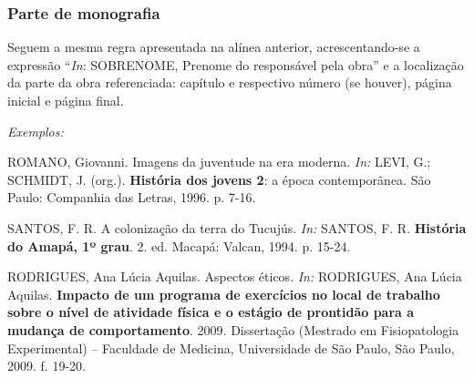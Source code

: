 \documentclass[10pt,a4paper]{article}
\newenvironment{referencias}
  {\begin{list}{}{\setlength{\leftmargin}{2.2em}\setlength{\itemsep}{\baselineskip}
     \setlength{\parsep}{0pt}\setlength{\topsep}{4pt}}
   \singlespacing\raggedright\sloppy}
  {\end{list}}
\newcommand{\referencia}{\item[]}
\newcommand{\exemplos}{\item[]{\itshape Exemplos:}\vspace{-\baselineskip}}
\begin{document}
\subsubsection*{Parte de monografia}
Seguem a mesma regra apresentada na alínea anterior, acrescentando-se a expressão ``\textit{In}: SOBRENOME, Prenome do responsável pela obra'' e a localização da parte da obra referenciada: capítulo e respectivo número (se houver), página inicial e página final.
\begin{referencias}
  \exemplos
  \referencia ROMANO, Giovanni. Imagens da juventude na era moderna. \textit{In:} LEVI, G.; SCHMIDT, J. (org.). \textbf{História dos jovens 2}: a época contemporânea. São Paulo: Companhia das Letras, 1996. p. 7-16.
  \referencia SANTOS, F. R. A colonização da terra do Tucujús. \textit{In:} SANTOS, F. R. \textbf{História do Amapá, 1º grau}. 2. ed. Macapá: Valcan, 1994. p. 15-24.
  \referencia RODRIGUES, Ana Lúcia Aquilas. Aspectos éticos. \textit{In:} RODRIGUES, Ana Lúcia Aquilas. \textbf{Impacto de um programa de exercícios no local de trabalho sobre o nível de atividade física e o estágio de prontidão para a mudança de comportamento}. 2009. Dissertação (Mestrado em Fisiopatologia Experimental) -- Faculdade de Medicina, Universidade de São Paulo, São Paulo, 2009. f. 19-20.
\end{referencias}
\end{document}
